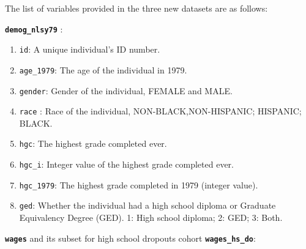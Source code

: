 \documentclass[12pt]{article}
\providecommand{\tightlist}{%
  \setlength{\itemsep}{0pt}\setlength{\parskip}{0pt}}
\begin{document}
The list of variables provided in the three new datasets are as follows:

\textbf{\texttt{demog\_nlsy79}} :

\begin{enumerate}
\def\labelenumi{\arabic{enumi}.}
\tightlist
\item
  \texttt{id}: A unique individual's ID number.
\item
  \texttt{age\_1979}: The age of the individual in 1979.
\item
  \texttt{gender}: Gender of the individual, FEMALE and MALE.
\item
  \texttt{race} : Race of the individual, NON-BLACK,NON-HISPANIC; HISPANIC; BLACK.
\item
  \texttt{hgc}: The highest grade completed ever.
\item
  \texttt{hgc\_i}: Integer value of the highest grade completed ever.
\item
  \texttt{hgc\_1979}: The highest grade completed in 1979 (integer value).
\item
  \texttt{ged}: Whether the individual had a high school diploma or Graduate Equivalency Degree (GED). 1: High school diploma; 2: GED; 3: Both.
\end{enumerate}

\textbf{\texttt{wages}} and its subset for high school dropouts cohort \textbf{\texttt{wages\_hs\_do}}:
\end{document}
